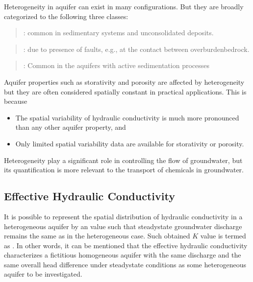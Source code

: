 \documentclass[letterpaper,10pt,english]{jupyterBook}
\begin{document}
\sphinxAtStartPar
Heterogeneity in aquifer can exist in many configurations. But they are broadly categorized to the following three classes:
\begin{quote}

\sphinxAtStartPar
{}: common in sedimentary systems and unconsolidated deposits.
\end{quote}
\begin{quote}

\sphinxAtStartPar
{}: due to presence of faults, e.g., at the contact between overburden\sphinxhyphen{}bedrock.
\end{quote}
\begin{quote}

\sphinxAtStartPar
{}: Common in the aquifers with active sedimentation processes
\end{quote}

\sphinxAtStartPar
Aquifer properties such as storativity and porosity are affected by heterogeneity but they are often considered spatially constant in practical applications. This is because
\begin{itemize}
\item {} 
\sphinxAtStartPar
The spatial variability of hydraulic conductivity is much more pronounced than any other aquifer property, and

\item {} 
\sphinxAtStartPar
Only limited spatial variability data are available for storativity or porosity.

\end{itemize}

\sphinxAtStartPar
Heterogeneity play a significant role in controlling the flow of groundwater, but its quantification is more relevant to the transport of chemicals in groundwater.


\subsection{Effective Hydraulic Conductivity}
\label{\detokenize{content/flow/L5/15_het_iso:effective-hydraulic-conductivity}}
\sphinxAtStartPar
It is possible to represent the spatial distribution of
hydraulic conductivity in a heterogeneous aquifer by an 
value such that steady\sphinxhyphen{}state groundwater discharge remains the
same as in the heterogeneous case. Such obtained  \(K\) value is termed as . In other words, it can be mentioned that the effective hydraulic conductivity characterizes a
fictitious homogeneous aquifer with the same discharge and the
same overall head difference under steady\sphinxhyphen{}state conditions as some
heterogeneous aquifer to be investigated.
\end{document}
